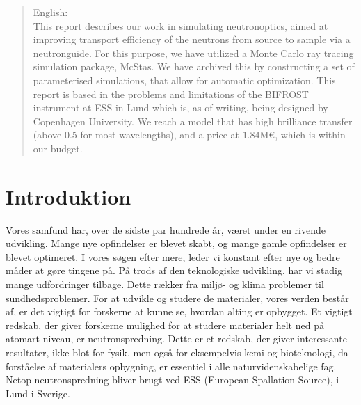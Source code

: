 \documentclass[12pt,oneside,a4paper]{article}
\begin{document}
{{{{{\begin{abstract}
English:
\\
This report describes our work in simulating neutronoptics, aimed at improving transport efficiency of the neutrons from source to sample via a neutronguide. For this purpose, we have utilized a Monte Carlo ray tracing simulation package, McStas. We have archived this by constructing a set of parameterised simulations, that allow for automatic optimization. This report is based in the problems and limitations of the BIFROST instrument at ESS in Lund which is, as of writing, being designed by Copenhagen University. We reach a model that has high brilliance transfer (above 0.5 for most wavelengths), and a price at $1.84\text{M€}$, which is within our budget.
\end{abstract}

\newpage

\tableofcontents

\newpage


\section{Introduktion}

Vores samfund har, over de sidste par hundrede år, været under en rivende udvikling. Mange nye opfindelser er blevet skabt, og mange gamle opfindelser er blevet optimeret. I vores søgen efter mere, leder vi konstant efter nye og bedre måder at gøre tingene på. På trods af den teknologiske udvikling, har vi stadig mange udfordringer tilbage. Dette rækker fra miljø- og klima problemer til sundhedsproblemer. For at udvikle og studere de materialer, vores verden består af, er det vigtigt for forskerne at kunne se, hvordan alting er opbygget. Et vigtigt redskab, der giver forskerne mulighed for at studere materialer helt ned på atomart niveau, er neutronspredning. Dette er et redskab, der giver interessante resultater, ikke blot for fysik, men også for eksempelvis kemi og bioteknologi, da forståelse af materialers opbygning, er essentiel i alle naturvidenskabelige fag. Netop neutronspredning bliver brugt ved ESS (European Spallation Source), i Lund i Sverige. \cite{ess_folder} \cite{ess_hjemmeside}

}}}}}
\end{document}
